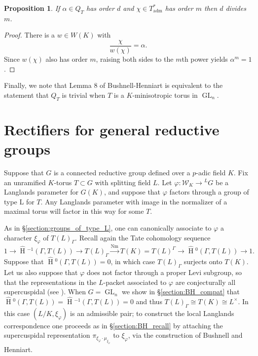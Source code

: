 \documentclass{compositio}
\theoremstyle{plain}
\newtheorem{proposition}[theorem]{Proposition}
\newcommand{\HT}[1]{\hat{\HH}{}^{#1}}
\theoremstyle{definition}
\DeclareMathOperator{\HH}{H}
\DeclareMathOperator{\Nm}{Nm}
\DeclareMathOperator{\GL}{GL}
\newcommand{\Lx}{L^\times}
\newcommand{\Weil}{\mathcal{W}}
\newcommand{\Thadm}{T^*_{\operatorname{adm}}}
\begin{document}
\begin{proposition} \label{orderdiv}
If $\alpha \in Q_T$ has order $d$ and $\chi \in \Thadm$ has order $m$ then $d$ divides $m$.
\end{proposition}
\begin{proof}
There is a $w \in W(K)$ with
$$\frac{\chi}{w(\chi)} = \alpha.$$
Since $w(\chi)$ also has order $m$, raising both sides to the $m$th power  yields $\alpha^m = 1$.
\end{proof}

Finally, we note that Lemma 8 of Bushnell-Henniart \cite[p. 511]{bushnell-henniart:10a} is equivalent to
the statement that $Q_T$ is trivial when $T$ is a $K$-minisotropic torus in $\GL_n$.

\section{Rectifiers for general reductive groups} \label{section:general_rectifiers}

Suppose that $G$ is a connected reductive group defined over a
$p$-adic field $K$.  Fix an unramified $K$-torus $T \subset G$ with splitting field $L$.
Let $\varphi : \Weil_K \rightarrow {}^L G$ be a
Langlands parameter for $G(K)$, and suppose that $\varphi$ factors
through a group of type L for $T$.  Any Langlands parameter with image in the normalizer
of a maximal torus will factor in this way for some $T$.

As in \S\ref{section:groups_of_type_L}, one can canonically
associate to $\varphi$ a character $\xi_{\varphi}$ of $T(L)_{\Gamma}$.
Recall again the Tate cohomology sequence
$$1 \rightarrow \HT{-1}(\Gamma,T(L)) \rightarrow T(L)_{\Gamma} \xrightarrow{\Nm} T(K)
= T(L)^{\Gamma} \rightarrow \HT{0}(\Gamma,T(L)) \rightarrow 1.$$
Suppose that $\HT{0}(\Gamma, T(L)) = 0$, in which case
$T(L)_{\Gamma}$ surjects onto $T(K)$.  Let us also suppose that
$\varphi$ does not factor through a proper Levi subgroup, so that the
representations in the $L$-packet associated to $\varphi$ are
conjecturally all supercuspidal (see \cite[\S 3.5]{reeder-debacker:09a}).
When $G = \GL_n$ we show in \S\ref{section:BH_compat} that 
$\HT{0}(\Gamma, T(L)) = \HT{-1}(\Gamma, T(L)) = 0$ and thus
$T(L)_{\Gamma} \cong T(K) \cong \Lx$.  In this case
$(L/K, \xi_{\varphi})$ is an admissible pair; to construct the local Langlands
correspondence one proceeds as in \S\ref{section:BH_recall} by
attaching the supercuspidal representation $\pi_{\xi_{\varphi} \cdot
  \mu_{\xi_{\varphi}}}$ to $\xi_{\varphi}$, via the construction of Bushnell and Henniart.
\end{document}
